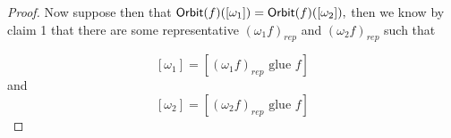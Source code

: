 \documentclass{amsart}
\theoremstyle{definition}
\theoremstyle{remark}
\DeclareMathOperator{\id}{\sf id}
\begin{document}
\begin{proof}
\noindent Now suppose then that ${\sf Orbit}(f)([\omega_{1}]) = {\sf Orbit}(f)([\omega_{2}]),$ then we know by claim 1 that there are some representative $(\omega_{1}f)_{rep}$ and $(\omega_{2}f)_{rep}$ such that

$$[\omega_{1}] = [(\omega_{1}f)_{rep} \text{ glue } f]$$
and  
$$[\omega_{2}] = [(\omega_{2}f)_{rep} \text{ glue } f]$$

\end{proof}
\end{document}
